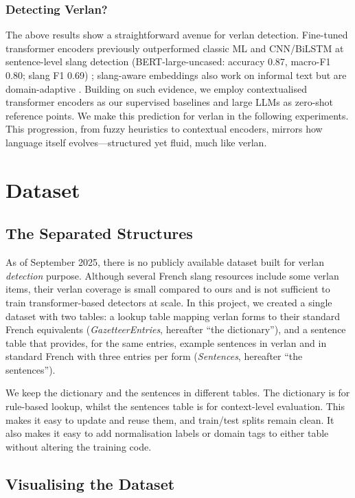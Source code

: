 \documentclass[12pt]{article}
\begin{document}
\subsubsection{Detecting Verlan?}

The above results show a straightforward avenue for verlan detection. Fine-tuned transformer encoders previously outperformed classic ML and CNN/BiLSTM at sentence-level slang detection (BERT-large-uncased: accuracy 0.87, macro-F1 0.80; slang F1 0.69) \cite{slangornot2024}; slang-aware embeddings also work on informal text but are domain-adaptive \cite{urban2020embeddings}. Building on such evidence, we employ contextualised transformer encoders as our supervised baselines and large LLMs as zero-shot reference points. We make this prediction for verlan in the following experiments. This progression, from fuzzy heuristics to contextual encoders, mirrors how language itself evolves\;---\;structured yet fluid, much like verlan.

\section{Dataset}
\subsection{The Separated Structures}
As of September 2025, there is no publicly available dataset built for verlan \textit{detection} purpose. Although several French slang resources include some verlan items, their verlan coverage is small compared to ours and is not sufficient to train transformer-based detectors at scale. In this project, we created a single dataset with two tables: a lookup table mapping verlan forms to their standard French equivalents (\textit{GazetteerEntries}, hereafter ``the dictionary''), and a sentence table that provides, for the same entries, example sentences in verlan and in standard French with three entries per form (\textit{Sentences}, hereafter ``the sentences''). 

We keep the dictionary and the sentences in different tables. The dictionary is for rule-based lookup, whilst the sentences table is for context-level evaluation. This makes it easy to update and reuse them, and train/test splits remain clean. It also makes it easy to add normalisation labels or domain tags to either table without altering the training code.

\subsection{Visualising the Dataset}
\end{document}
